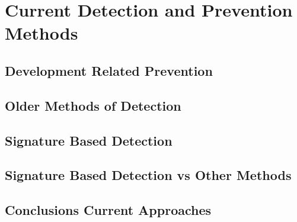\chapter{Current Detection and Prevention Methods}

\section{Development Related Prevention}

\section{Older Methods of Detection}

\section{Signature Based Detection}

\section{Signature Based Detection vs Other Methods}

\section{Conclusions Current Approaches}